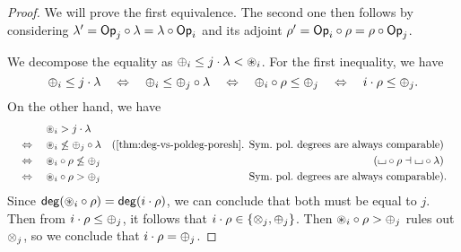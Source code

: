 \documentclass[a4paper]{memoir}
\begin{document}
\begin{proof}
	We will prove the first equivalence. The second one then follows by considering $\lambda' = {\mathsf{Op}}_j \circ \lambda = \lambda \circ {\mathsf{Op}}_i$ and its adjoint $\rho' = {\mathsf{Op}}_i \circ \rho = \rho \circ {\mathsf{Op}}_j$.
	
	We decompose the equality as ${\oplus}_i \leq j \cdot \lambda < {\oast}_i$.
	For the first inequality, we have
	\[
		{\oplus}_i \leq j \cdot \lambda
		\quad\Leftrightarrow\quad
		{\oplus}_i \leq {\oplus}_j \circ \lambda
		\quad\Leftrightarrow\quad
		{\oplus}_i \circ \rho \leq {\oplus}_j
		\quad\Leftrightarrow\quad
		i \cdot \rho \leq {\oplus}_j.
	\]
	On the other hand, we have
	\begin{align*}
		&\quad\mathrel{\phantom{\Leftrightarrow}}\quad
		\isopol_i > j \cdot \lambda
		\\ &\quad\Leftrightarrow\quad
		\isopol_i \not\leq \pospol_j \circ \lambda
		& \text{(\Cref{thm:deg-vs-poldeg-poresh}. Sym.\ pol.\ degrees are always comparable)}
		\\ &\quad\Leftrightarrow\quad
		\isopol_i \circ \rho \not\leq \pospol_j
		& \text{($\loch \circ \rho \dashv \loch \circ \lambda$)}
		\\ &\quad\Leftrightarrow\quad
		\isopol_i \circ \rho > \pospol_j
		& \text{Sym.\ pol.\ degrees are always comparable)}&.
	\end{align*}
	Since $\mathsf{deg}({\oast}_i \circ \rho) = \mathsf{deg}(i \cdot \rho)$, we can conclude that both must be equal to $j$. Then from $i \cdot \rho \leq {\oplus}_j$, it follows that $i \cdot \rho \in \mathopen{}\left\{ {\otimes}_j, {\oplus}_j \right\}\mathclose{}$.
	Then ${\oast}_i \circ \rho > {\oplus}_j$ rules out ${\otimes}_j$, so we conclude that $i \cdot \rho = {\oplus}_j$.
\end{proof}
\end{document}
